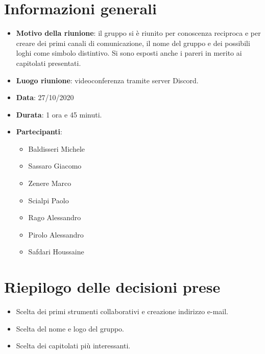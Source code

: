 \section{Informazioni generali}
\begin{itemize}
\item \textbf{Motivo della riunione}: il gruppo si è riunito per conoscenza reciproca e per creare dei primi canali di comunicazione, il nome del gruppo e dei possibili loghi come simbolo distintivo. Si sono esposti anche i pareri in merito ai capitolati presentati.
\item \textbf{Luogo riunione}: videoconferenza tramite server Discord.
\item \textbf{Data}: 27/10/2020
\item \textbf{Durata}: 1 ora e 45 minuti.
\item \textbf{Partecipanti}:
	\begin{itemize}
	\item Baldisseri Michele
	\item Sassaro Giacomo
	\item Zenere Marco
	\item Scialpi Paolo
	\item Rago Alessandro
	\item Pirolo Alessandro
	\item Safdari Houssaine
	\end{itemize}
\end{itemize}
\newpage
\section{Riepilogo delle decisioni prese}
\begin{itemize}
\item Scelta dei primi strumenti collaborativi e creazione indirizzo e-mail.
\item Scelta del nome e logo del gruppo.
\item Scelta dei capitolati più interessanti.
\end{itemize}
